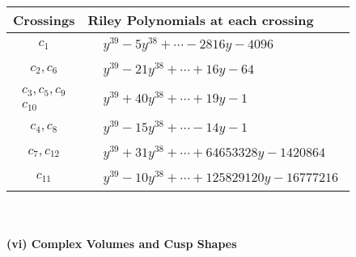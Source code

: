 \documentclass[1p]{elsarticle_modified}
\theoremstyle{definition}
\begin{document}
\begin{tabular}{m{50pt}|m{274pt}}
Crossings & \hspace{64pt}Riley Polynomials at each crossing \\
\hline $$\begin{aligned}c_{1}\end{aligned}$$&$\begin{aligned}
&y^{39}-5 y^{38}+\cdots-2816 y-4096
\end{aligned}$\\
\hline $$\begin{aligned}c_{2},c_{6}\end{aligned}$$&$\begin{aligned}
&y^{39}-21 y^{38}+\cdots+16 y-64
\end{aligned}$\\
\hline $$\begin{aligned}c_{3},c_{5},c_{9}\\c_{10}\end{aligned}$$&$\begin{aligned}
&y^{39}+40 y^{38}+\cdots+19 y-1
\end{aligned}$\\
\hline $$\begin{aligned}c_{4},c_{8}\end{aligned}$$&$\begin{aligned}
&y^{39}-15 y^{38}+\cdots-14 y-1
\end{aligned}$\\
\hline $$\begin{aligned}c_{7},c_{12}\end{aligned}$$&$\begin{aligned}
&y^{39}+31 y^{38}+\cdots+64653328 y-1420864
\end{aligned}$\\
\hline $$\begin{aligned}c_{11}\end{aligned}$$&$\begin{aligned}
&y^{39}-10 y^{38}+\cdots+125829120 y-16777216
\end{aligned}$\\
\hline
\end{tabular}\\~\\
\newpage\flushleft \textbf{(vi) Complex Volumes and Cusp Shapes}
\end{document}
